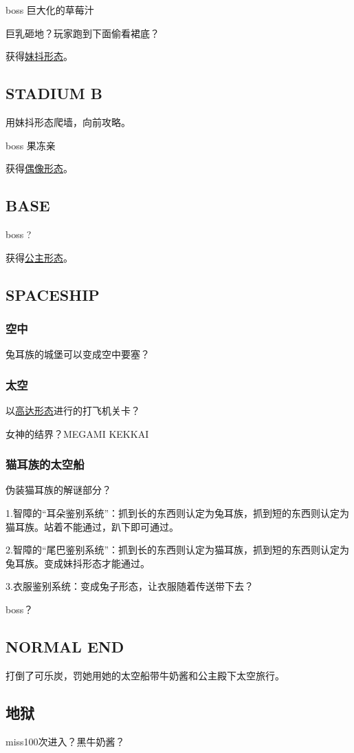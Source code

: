\documentclass{article}
\begin{document}
boss 巨大化的草莓汁

巨乳砸地？玩家跑到下面偷看裙底？

获得\hyperref[costume_maid]{妹抖形态}。

\subsection{STADIUM B}

用妹抖形态爬墙，向前攻略。

boss 果冻亲

获得\hyperref[costume_idol]{偶像形态}。



\subsection{BASE}

boss ?

获得\hyperref[costume_hime]{公主形态}。

\subsection{SPACESHIP}

\subsubsection{空中}

兔耳族的城堡可以变成空中要塞？

\subsubsection{太空}
以\hyperref[costume_gundam]{高达形态}进行的打飞机关卡？

女神的结界？MEGAMI KEKKAI

\subsubsection{猫耳族的太空船}

伪装猫耳族的解谜部分？

1.智障的“耳朵鉴别系统”：抓到长的东西则认定为兔耳族，抓到短的东西则认定为猫耳族。站着不能通过，趴下即可通过。

2.智障的“尾巴鉴别系统”：抓到长的东西则认定为猫耳族，抓到短的东西则认定为兔耳族。变成妹抖形态才能通过。

3.衣服鉴别系统：变成兔子形态，让衣服随着传送带下去？

boss？

\subsection{NORMAL END}

打倒了可乐炭，罚她用她的太空船带牛奶酱和公主殿下太空旅行。

\subsection{地狱}

miss100次进入？黑牛奶酱？
\end{document}
